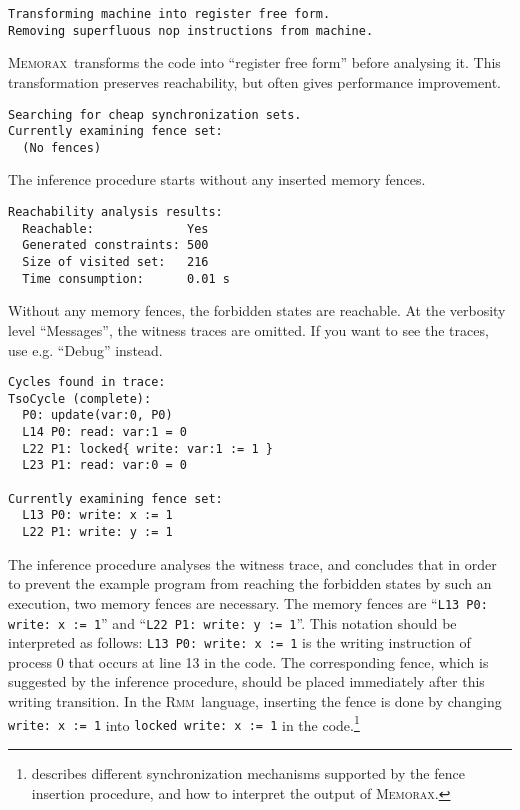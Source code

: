 \documentclass[a4paper]{article}
\newcommand{\memorax}{\textsc{Memorax}}
\newcommand{\rmm}{\textsc{Rmm}}
\begin{document}
\noindent
\begin{verbatim}
Transforming machine into register free form.
Removing superfluous nop instructions from machine.
\end{verbatim}

\memorax\ transforms the code into ``register free form'' before
analysing it. This transformation preserves reachability, but often
gives performance improvement.

\noindent
\begin{verbatim}
Searching for cheap synchronization sets.
Currently examining fence set:
  (No fences)
\end{verbatim}

The inference procedure starts without any inserted memory fences.

\noindent
\begin{verbatim}
Reachability analysis results:
  Reachable:             Yes
  Generated constraints: 500
  Size of visited set:   216
  Time consumption:      0.01 s
\end{verbatim}

Without any memory fences, the forbidden states are reachable. At the
verbosity level ``Messages'', the witness traces are omitted. If you
want to see the traces, use e.g. ``Debug'' instead.

\noindent
\begin{verbatim}
Cycles found in trace:
TsoCycle (complete):
  P0: update(var:0, P0)
  L14 P0: read: var:1 = 0
  L22 P1: locked{ write: var:1 := 1 }
  L23 P1: read: var:0 = 0

Currently examining fence set:
  L13 P0: write: x := 1
  L22 P1: write: y := 1
\end{verbatim}

The inference procedure analyses the witness trace, and concludes that
in order to prevent the example program from reaching the forbidden
states by such an execution, two memory fences are necessary. The
memory fences are ``{\tt L13 P0: write: x := 1}'' and ``{\tt L22 P1:
  write: y := 1}''. This notation should be interpreted as follows:
{\tt L13 P0: write: x := 1} is the writing instruction of process 0
that occurs at line 13 in the code. The corresponding fence, which is
suggested by the inference procedure, should be placed immediately
after this writing transition. In the \rmm\ language, inserting the
fence is done by changing {\tt write: x := 1} into {\tt locked write:
  x := 1} in the code.\footnote{ describes
  different synchronization mechanisms supported by the fence
  insertion procedure, and how to interpret the output of \memorax.}
\end{document}
